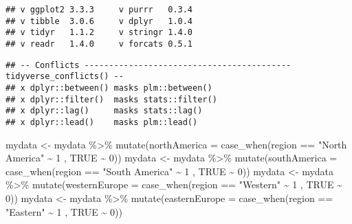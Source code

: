 \documentclass[
]{article}
\newenvironment{Shaded}{\begin{snugshade}}{\end{snugshade}}
\newcommand{\AttributeTok}[1]{\textcolor[rgb]{0.77,0.63,0.00}{#1}}
\newcommand{\ConstantTok}[1]{\textcolor[rgb]{0.00,0.00,0.00}{#1}}
\newcommand{\DecValTok}[1]{\textcolor[rgb]{0.00,0.00,0.81}{#1}}
\newcommand{\FunctionTok}[1]{\textcolor[rgb]{0.00,0.00,0.00}{#1}}
\newcommand{\NormalTok}[1]{#1}
\newcommand{\OtherTok}[1]{\textcolor[rgb]{0.56,0.35,0.01}{#1}}
\newcommand{\SpecialCharTok}[1]{\textcolor[rgb]{0.00,0.00,0.00}{#1}}
\newcommand{\StringTok}[1]{\textcolor[rgb]{0.31,0.60,0.02}{#1}}
\begin{document}
\begin{verbatim}
## v ggplot2 3.3.3     v purrr   0.3.4
## v tibble  3.0.6     v dplyr   1.0.4
## v tidyr   1.1.2     v stringr 1.4.0
## v readr   1.4.0     v forcats 0.5.1
\end{verbatim}

\begin{verbatim}
## -- Conflicts ------------------------------------------ tidyverse_conflicts() --
## x dplyr::between() masks plm::between()
## x dplyr::filter()  masks stats::filter()
## x dplyr::lag()     masks stats::lag()
## x dplyr::lead()    masks plm::lead()
\end{verbatim}

\begin{Shaded}
\begin{Highlighting}[]
\NormalTok{mydata }\OtherTok{\textless{}{-}}\NormalTok{ mydata }\SpecialCharTok{\%\textgreater{}\%} \FunctionTok{mutate}\NormalTok{(}\AttributeTok{northAmerica =} \FunctionTok{case\_when}\NormalTok{(region }\SpecialCharTok{==} \StringTok{"North America"} \SpecialCharTok{\textasciitilde{}} \DecValTok{1}
\NormalTok{                                                      , }\ConstantTok{TRUE} \SpecialCharTok{\textasciitilde{}} \DecValTok{0}\NormalTok{))}
\NormalTok{mydata }\OtherTok{\textless{}{-}}\NormalTok{ mydata }\SpecialCharTok{\%\textgreater{}\%} \FunctionTok{mutate}\NormalTok{(}\AttributeTok{southAmerica =} \FunctionTok{case\_when}\NormalTok{(region }\SpecialCharTok{==} \StringTok{"South America"} \SpecialCharTok{\textasciitilde{}} \DecValTok{1}
\NormalTok{                                                      , }\ConstantTok{TRUE} \SpecialCharTok{\textasciitilde{}} \DecValTok{0}\NormalTok{))}
\NormalTok{mydata }\OtherTok{\textless{}{-}}\NormalTok{ mydata }\SpecialCharTok{\%\textgreater{}\%} \FunctionTok{mutate}\NormalTok{(}\AttributeTok{westernEurope =} \FunctionTok{case\_when}\NormalTok{(region }\SpecialCharTok{==} \StringTok{"Western"} \SpecialCharTok{\textasciitilde{}} \DecValTok{1}
\NormalTok{                                                      , }\ConstantTok{TRUE} \SpecialCharTok{\textasciitilde{}} \DecValTok{0}\NormalTok{))}
\NormalTok{mydata }\OtherTok{\textless{}{-}}\NormalTok{ mydata }\SpecialCharTok{\%\textgreater{}\%} \FunctionTok{mutate}\NormalTok{(}\AttributeTok{easternEurope =} \FunctionTok{case\_when}\NormalTok{(region }\SpecialCharTok{==} \StringTok{"Eastern"} \SpecialCharTok{\textasciitilde{}} \DecValTok{1}
\NormalTok{                                                      , }\ConstantTok{TRUE} \SpecialCharTok{\textasciitilde{}} \DecValTok{0}\NormalTok{))}

\end{Highlighting}
\end{Shaded}
\end{document}
